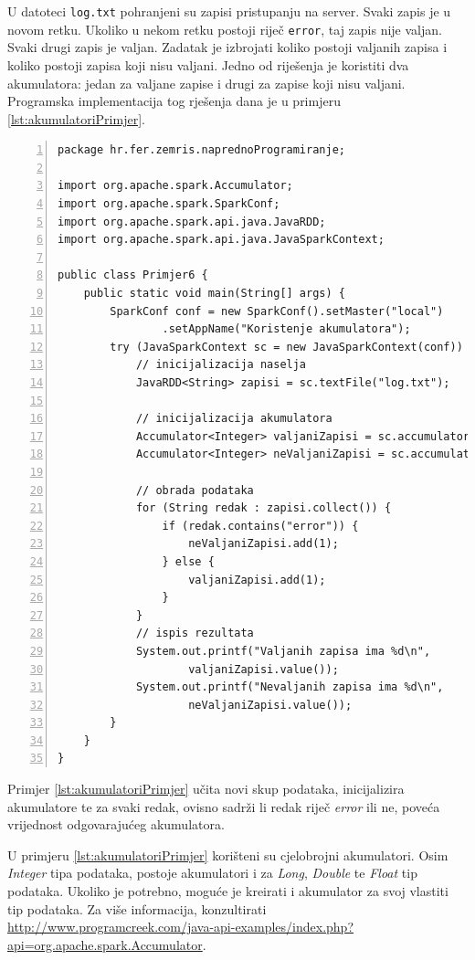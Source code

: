 \documentclass[times, utf8, zavrsni, numeric]{fer}
\begin{document}
U datoteci \texttt{log.txt} pohranjeni su zapisi pristupanju na server. Svaki zapis je u novom retku. Ukoliko u nekom retku postoji riječ \texttt{error}, taj zapis nije valjan. Svaki drugi zapis je valjan. Zadatak je izbrojati koliko postoji valjanih zapisa i koliko postoji zapisa koji nisu valjani. Jedno od riješenja je koristiti dva akumulatora: jedan za valjane zapise i drugi za zapise koji nisu valjani. Programska implementacija tog rješenja dana je u primjeru \ref{lst:akumulatoriPrimjer}.

\begin{lstlisting}[numbers=left, label={lst:akumulatoriPrimjer}, caption={Korištenje akumulatora.}, escapechar=|]
package hr.fer.zemris.naprednoProgramiranje;

import org.apache.spark.Accumulator;
import org.apache.spark.SparkConf;
import org.apache.spark.api.java.JavaRDD;
import org.apache.spark.api.java.JavaSparkContext;

public class Primjer6 {
	public static void main(String[] args) {
		SparkConf conf = new SparkConf().setMaster("local")
				.setAppName("Koristenje akumulatora");
		try (JavaSparkContext sc = new JavaSparkContext(conf)) {
			// inicijalizacija naselja
			JavaRDD<String> zapisi = sc.textFile("log.txt");

			// inicijalizacija akumulatora
			Accumulator<Integer> valjaniZapisi = sc.accumulator(0);
			Accumulator<Integer> neValjaniZapisi = sc.accumulator(0);

			// obrada podataka
			for (String redak : zapisi.collect()) {
				if (redak.contains("error")) {
					neValjaniZapisi.add(1);
				} else {
					valjaniZapisi.add(1);
				}
			}
			// ispis rezultata
			System.out.printf("Valjanih zapisa ima %d\n",
					valjaniZapisi.value());
			System.out.printf("Nevaljanih zapisa ima %d\n",
					neValjaniZapisi.value());
		}
	}
}
\end{lstlisting}

Primjer \ref{lst:akumulatoriPrimjer} učita novi skup podataka, inicijalizira akumulatore te za svaki redak, ovisno sadrži li redak riječ \emph{error} ili ne, poveća vrijednost odgovarajućeg akumulatora.

U primjeru \ref{lst:akumulatoriPrimjer} korišteni su cjelobrojni akumulatori. Osim \emph{Integer} tipa podataka, postoje akumulatori i za \emph{Long}, \emph{Double} te \emph{Float} tip podataka. Ukoliko je potrebno, moguće je kreirati i akumulator za svoj vlastiti tip podataka. Za više informacija, konzultirati \url{http://www.programcreek.com/java-api-examples/index.php?api=org.apache.spark.Accumulator}.
\end{document}
